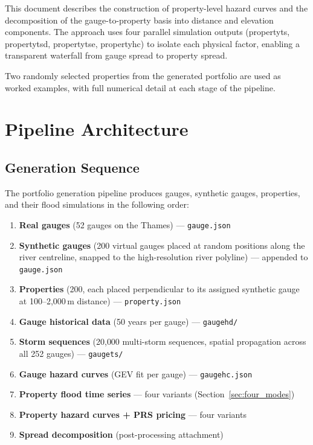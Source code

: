 \documentclass[11pt,a4paper]{article}
\begin{document}
\mkmtitlepage
\mkmlegalpage
\tableofcontents
\clearpage

\mkmexecsummary

This document describes the construction of property-level hazard curves and the
decomposition of the gauge-to-property basis into distance and elevation components.
The approach uses four parallel simulation outputs (propertyts, propertytsd,
propertytse, propertyhc) to isolate each physical factor, enabling a transparent
waterfall from gauge spread to property spread.

Two randomly selected properties from the generated portfolio are used as worked
examples, with full numerical detail at each stage of the pipeline.

\section{Pipeline Architecture}

\subsection{Generation Sequence}

The portfolio generation pipeline produces gauges, synthetic gauges, properties, and
their flood simulations in the following order:

\begin{enumerate}[nosep]
    \item \textbf{Real gauges} (52 gauges on the Thames) --- \texttt{gauge.json}
    \item \textbf{Synthetic gauges} (200 virtual gauges placed at random positions
          along the river centreline, snapped to the high-resolution river polyline)
          --- appended to \texttt{gauge.json}
    \item \textbf{Properties} (200, each placed perpendicular to its assigned
          synthetic gauge at 100--2{,}000\,m distance) --- \texttt{property.json}
    \item \textbf{Gauge historical data} (50 years per gauge) --- \texttt{gaugehd/}
    \item \textbf{Storm sequences} (20{,}000 multi-storm sequences, spatial
          propagation across all 252 gauges) --- \texttt{gaugets/}
    \item \textbf{Gauge hazard curves} (GEV fit per gauge) --- \texttt{gaugehc.json}
    \item \textbf{Property flood time series} --- four variants (Section~\ref{sec:four_modes})
    \item \textbf{Property hazard curves + PRS pricing} --- four variants
    \item \textbf{Spread decomposition} (post-processing attachment)
\end{enumerate}
\end{document}
